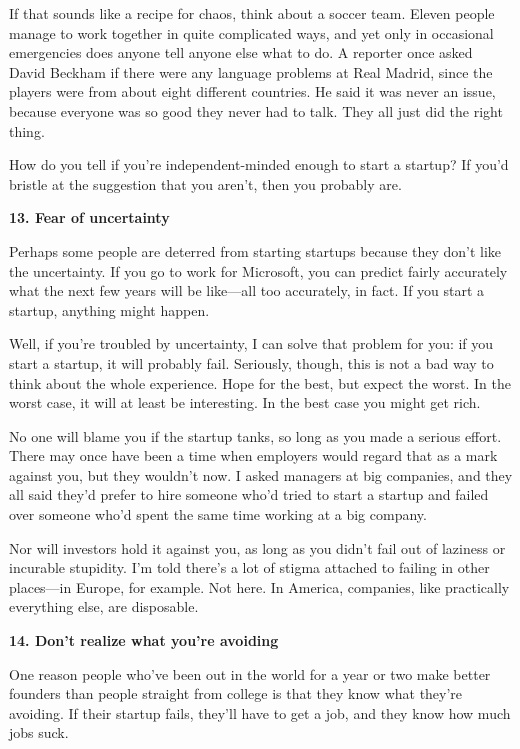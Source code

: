 If that sounds like a recipe for chaos, think about a soccer team.
Eleven people manage to work together in quite complicated ways, and yet
only in occasional emergencies does anyone tell anyone else what to do.
A reporter once asked David Beckham if there were any language problems
at Real Madrid, since the players were from about eight different
countries. He said it was never an issue, because everyone was so good
they never had to talk. They all just did the right thing.

How do you tell if you're independent-minded enough to start a startup?
If you'd bristle at the suggestion that you aren't, then you probably
are.

\textbf{13. Fear of uncertainty}

Perhaps some people are deterred from starting startups because they
don't like the uncertainty. If you go to work for Microsoft, you can
predict fairly accurately what the next few years will be like---all too
accurately, in fact. If you start a startup, anything might happen.

Well, if you're troubled by uncertainty, I can solve that problem for
you: if you start a startup, it will probably fail. Seriously, though,
this is not a bad way to think about the whole experience. Hope for the
best, but expect the worst. In the worst case, it will at least be
interesting. In the best case you might get rich.

No one will blame you if the startup tanks, so long as you made a
serious effort. There may once have been a time when employers would
regard that as a mark against you, but they wouldn't now. I asked
managers at big companies, and they all said they'd prefer to hire
someone who'd tried to start a startup and failed over someone who'd
spent the same time working at a big company.

Nor will investors hold it against you, as long as you didn't fail out
of laziness or incurable stupidity. I'm told there's a lot of stigma
attached to failing in other places---in Europe, for example. Not here.
In America, companies, like practically everything else, are disposable.

\textbf{14. Don't realize what you're avoiding}

One reason people who've been out in the world for a year or two make
better founders than people straight from college is that they know what
they're avoiding. If their startup fails, they'll have to get a job, and
they know how much jobs suck.


